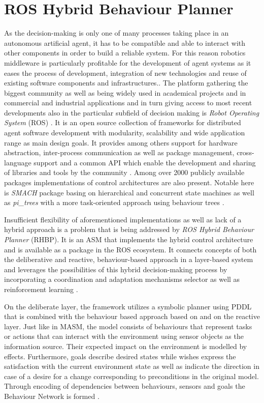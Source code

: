 \section{ROS Hybrid Behaviour Planner}
As the decision-making is only one of many processes taking place in an autonomous artificial agent, it has to be compatible and able to interact with other components in order to build a reliable system. For this reason robotics middleware is particularly profitable for the development of agent systems as it eases the process of development, integration of new technologies and reuse of existing software components and infrastructures.\cite{middleware}. The platform gathering the biggest community as well as being widely used in academical projects and in commercial and industrial applications and in turn giving access to most recent developments also in the particular subfield of decision making is \textit{Robot Operating System} (ROS) \cite{is-ros-good}. It is an open source collection of frameworks for distributed agent software development with modularity, scalability and wide application range as main design goals. It provides among others support for hardware abstraction, inter-process communication as well as  package management, cross-language support and a common API which enable the development and sharing of libraries and tools by the community \cite{ros}. Among over 2000 publicly available packages \cite{is-ros-good} implementations of control architectures are also present. Notable here is \textit{SMACH} package basing on hierarchical and concurrent state machines \cite{smach} as well as \textit{pi\_trees} with a more task-oriented approach using behaviour trees \cite{pi_trees}.\par 
Insufficient flexibility of aforementioned implementations as well as lack of a hybrid approach is a problem that is being addressed by \textit{ROS Hybrid Behaviour Planner} (RHBP). It is an ASM that implements the hybrid control architecture and is available as a package in the ROS ecosystem. It connects concepts of both the deliberative and reactive, behaviour-based approach in a layer-based system and leverages the possibilities of this hybrid decision-making process by incorporating a coordination and adaptation mechanisms selector as well as reinforcement learning \cite{hrabia}.\par 
On the deliberate layer, the framework utilizes a symbolic planner using PDDL that is combined with the behaviour based approach  based on \cite{jung} and \cite{maes} on the reactive layer. Just like in MASM, the model consists of behaviours that represent tasks or actions that can interact with the environment using sensor objects as the information source. Their expected impact on the environment is modelled by effects. Furthermore,  goals describe desired states while wishes express the satisfaction with the current environment state as well as indicate the direction in case of a desire for a change corresponding to preconditions in the original model. Through encoding of dependencies between behaviours, sensors and goals the Behaviour Network is formed \cite{hrabia}.\par 

